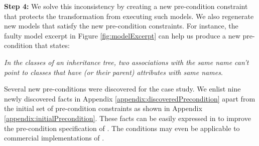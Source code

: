 \noindent \textbf{Step 4:}  We solve this inconsistency by creating a new pre-condition constraint that protects the transformation from executing such models. We also regenerate new models that satisfy the new pre-condition constraints. For instance, the faulty model excerpt in Figure \ref{fig:modelExcerpt} can help us produce a new pre-condition that states:

\emph{In the classes of an inheritance tree, two associations with the same name can't point to classes that have (or their parent) attributes with same names}.

Several new pre-conditions were discovered for the {\transfo} case study. We enlist nine newly discovered {\Alloy} facts in Appendix \ref{appendix:discoveredPrecondition} apart from the initial set of pre-condition constraints as shown in Appendix \ref{appendix:initialPrecondition}. These {\Alloy} facts can be easily expressed in {\OCL} to improve the pre-condition specification of {\transfo}. The conditions may even be applicable to commercial implementations of {\transfo}.

